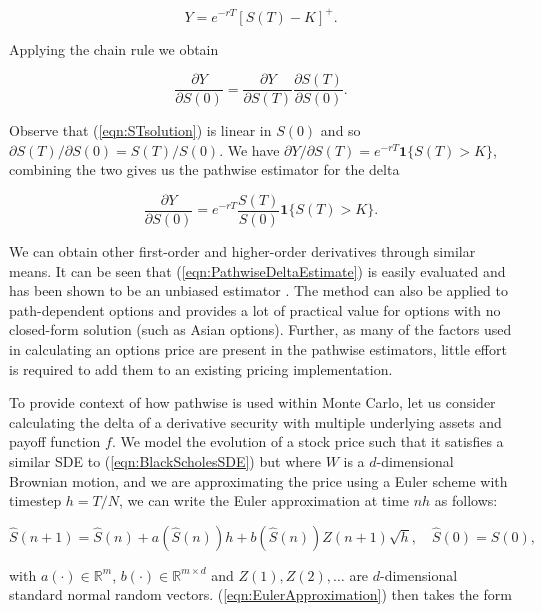 \begin{equation*}
    Y = e^{-rT}[S(T) - K]^+.
\end{equation*}

Applying the chain rule we obtain

\begin{equation} \label{eqn:ChainRuleOptionDelta}
    \frac{\partial Y}{\partial S(0)} = \frac{\partial Y}{\partial S(T)} \frac{\partial S(T)}{\partial S(0)}.
\end{equation}

Observe that (\ref{eqn:STsolution}) is linear in $S(0)$ and so $\partial S(T)/ \partial S(0) = S(T)/S(0)$. We have $\partial Y/ \partial S(T) = e^{-rT}\textbf{1}\{S(T) > K\}$, combining the two gives us the pathwise estimator for the delta

\begin{equation} \label{eqn:PathwiseDeltaEstimate}
    \frac{\partial Y}{\partial S(0)} = e^{-rT} \frac{S(T)}{S(0)} \textbf{1}\{S(T) > K\}.
\end{equation}

We can obtain other first-order and higher-order derivatives through similar means. It can be seen that (\ref{eqn:PathwiseDeltaEstimate}) is easily evaluated and has been shown to be an unbiased estimator \cite{broadie1996estimating}. The method can also be applied to path-dependent options and provides a lot of practical value for options with no closed-form solution (such as Asian options). Further, as many of the factors used in calculating an options price are present in the pathwise estimators, little effort is required to add them to an existing pricing implementation.

To provide context of how pathwise is used within Monte Carlo, let us consider calculating the delta of a derivative security with multiple underlying assets and payoff function $f$. We model the evolution of a stock price such that it satisfies a similar SDE to (\ref{eqn:BlackScholesSDE}) but where $W$ is a $d$-dimensional Brownian motion, and we are approximating the price using a Euler scheme with timestep $h = T/N$, we can write the Euler approximation at time $nh$ as follows:

\begin{equation} \label{eqn:EulerApproximation}
    \hat{S}(n + 1) = \hat{S}(n) + a(\hat{S}(n))h + b(\hat{S}(n)) Z(n+1) \sqrt{h}, \quad \hat{S}(0) = S(0), 
\end{equation}

with $a(\cdot) \in \mathbb{R}^m$, $b(\cdot) \in \mathbb{R}^{m \times d}$ and $Z(1), Z(2), \dots$ are $d$-dimensional standard normal random vectors. (\ref{eqn:EulerApproximation}) then takes the form

